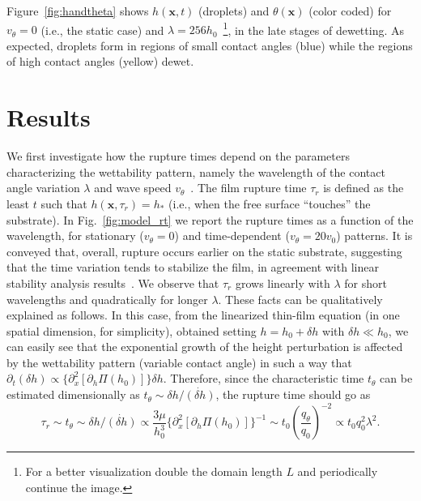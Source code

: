 Figure~\ref{fig:handtheta} shows $h(\mathbf{x},t)$ (droplets) and $\theta(\mathbf{x})$ (color coded) for $v_{\theta} = 0$ (i.e., the static case) and $\lambda = 256 h_0$~\footnote{For a better visualization double the domain length $L$ and periodically continue the image.}, in the late stages of dewetting.
As expected, droplets form in regions of small contact angles (blue) while the regions of high contact angles (yellow) dewet.

\section{Results} We first investigate how the rupture times depend on the parameters characterizing the wettability pattern, namely the wavelength of the contact angle variation $\lambda$ and wave speed $v_{\theta}$~\cite{karguptaMorphologicalSelforganizationDewetting2002,karguptaInstabilityPatternFormation2000,nisatoExcitationSurfaceDeformation1999,karimPhaseSeparationUltrathin1998, succiLatticeBoltzmannEquation2001}.
The film rupture time $\tau_r$ is defined as the least $t$ such that $h(\mathbf{x},\tau_r)=h_{\ast}$ (i.e., when the free surface ``touches'' the substrate).
In Fig.~\ref{fig:model_rt} we report the rupture times as a function of the wavelength, for stationary ($v_{\theta}=0$) and time-dependent ($v_{\theta}=20 v_0$) patterns. 
It is conveyed that, overall, rupture occurs earlier on the static substrate, suggesting that the time variation tends to stabilize the film, in agreement with linear stability analysis results~\cite{sumanDynamicsThinLiquid2006}.
We observe that $\tau_r$ grows linearly with $\lambda$ for short wavelengths and quadratically for longer $\lambda$.
These facts can be qualitatively explained as follows. 
In this case, from the linearized thin-film equation (in one spatial dimension, for simplicity), obtained setting $h=h_0 + \delta h$ with $\delta h \ll h_0$, we can easily see that the exponential growth of the height perturbation is affected by the wettability pattern (variable contact angle) in such a way that $\partial_t (\delta h) \propto \{\partial_x^2 [\partial_h\Pi(h_0)]\} \delta h$. Therefore, since the characteristic time $t_{\theta}$ can be estimated dimensionally as $t_{\theta} \sim \delta h/\dot{(\delta h)}$, the rupture time should go as
\begin{equation}\label{eq:taur_l2}
    \tau_r \sim t_{\theta} \sim  \delta h/\dot{(\delta h)} \propto \frac{3\mu}{h_0^3}\{\partial_x^2 [\partial_h\Pi (h_0)]\}^{-1} \sim t_0 \left(\frac{q_{\theta}}{q_0}\right)^{-2} \propto t_0 q_0^2 \lambda^2.
\end{equation}
